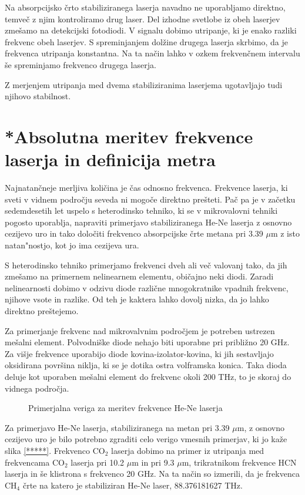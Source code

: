 Na absorpcijsko črto stabiliziranega laserja navadno ne uporabljamo
direktno, temveč z njim kontroliramo drug laser. Del izhodne svetlobe iz
obeh laserjev zmešamo na detekcijski fotodiodi. V signalu dobimo utripanje,
ki je enako razliki frekvenc obeh laserjev. S spreminjanjem dolžine drugega
laserja skrbimo, da je frekvenca utripanja konstantna. Na ta način lahko v
ozkem frekvenčnem intervalu še spreminjamo frekvenco drugega laserja.

Z merjenjem utripanja med dvema stabiliziranima laserjema ugotavljajo tudi
njihovo stabilnost.

\section{*Absolutna meritev frekvence laserja in definicija metra}

Najnatančneje merljiva količina je čas odnosno frekvenca. Frekvence
laserja, ki sveti v vidnem področju seveda ni mogoče direktno prešteti.
Pač pa je v začetku sedemdesetih let uspelo s heterodinsko tehniko, ki se
v mikrovalovni tehniki pogosto uporablja, napraviti primerjavo
stabiliziranega He-Ne laserja z osnovno cezijevo uro in tako določiti
frekvenco absorpcijske črte metana pri 3.39 $\mu$m z isto natan"nostjo, kot
jo ima cezijeva ura.

S heterodinsko tehniko primerjamo frekvenci dveh ali več valovanj tako, da
jih zmešamo na primernem nelinearnem elementu, običajno neki diodi. Zaradi
nelinearnosti dobimo v odzivu diode različne mnogokratnike vpadnih
frekvenc, njihove vsote in razlike. Od teh je kaktera lahko dovolj nizka, da
jo lahko direktno preštejemo.

Za primerjanje frekvenc nad mikrovalvnim področjem je potreben ustrezen
mešalni element. Polvodniške diode nehajo biti uporabne pri približno 20
GHz. Za višje frekvence uporabijo diode kovina-izolator-kovina, ki jih
sestavljajo oksidirana površina niklja, ki se je dotika ostra volframska
konica. Taka dioda deluje kot uporaben mešalni element do frekvenc okoli
200 THz, to je skoraj do vidnega področja.

\begin{figure}[tbp]
\label{s5.14} \vskip 15cm
\caption{Primerjalna veriga za meritev frekvence He-Ne laserja}
\end{figure}

Za primerjavo He-Ne laserja, stabiliziranega na metan pri 3.39 $\mu$m, z
osnovno cezijevo uro je bilo potrebno zgraditi celo verigo vmesnih
primerjav, ki jo kaže slika \ref{*****}. Frekvenco CO$_2$ laserja dobimo na
primer iz utripanja med frekvencama CO$_2$ laserja pri 10.2 $\mu$m in pri
9.3 $\mu$m, trikratnikom frekvence HCN laserja in še klistrona s frekvenco
20 GHz. Na ta način so izmerili, da je frekvenca CH$_4$ črte na katero je
stabiliziran He-Ne laser, 88.376181627 THz.

